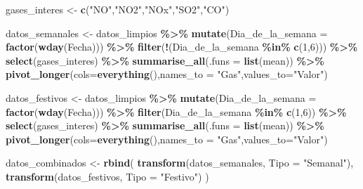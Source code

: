 \documentclass[notspecified,article,submit,moreauthors,pdftex]{Definitions/mdpi}
\newenvironment{Shaded}{\begin{snugshade}}{\end{snugshade}}
\newcommand{\AttributeTok}[1]{\textcolor[rgb]{0.13,0.29,0.53}{#1}}
\newcommand{\DecValTok}[1]{\textcolor[rgb]{0.00,0.00,0.81}{#1}}
\newcommand{\FunctionTok}[1]{\textcolor[rgb]{0.13,0.29,0.53}{\textbf{#1}}}
\newcommand{\NormalTok}[1]{#1}
\newcommand{\OtherTok}[1]{\textcolor[rgb]{0.56,0.35,0.01}{#1}}
\newcommand{\SpecialCharTok}[1]{\textcolor[rgb]{0.81,0.36,0.00}{\textbf{#1}}}
\newcommand{\StringTok}[1]{\textcolor[rgb]{0.31,0.60,0.02}{#1}}
\begin{document}
\begin{Shaded}
\begin{Highlighting}[]
\NormalTok{gases\_interes }\OtherTok{\textless{}{-}} \FunctionTok{c}\NormalTok{(}\StringTok{"NO"}\NormalTok{,}\StringTok{"NO2"}\NormalTok{,}\StringTok{"NOx"}\NormalTok{,}\StringTok{"SO2"}\NormalTok{,}\StringTok{"CO"}\NormalTok{)}

\NormalTok{datos\_semanales }\OtherTok{\textless{}{-}}\NormalTok{ datos\_limpios }\SpecialCharTok{\%\textgreater{}\%}
  \FunctionTok{mutate}\NormalTok{(}\AttributeTok{Dia\_de\_la\_semana =} \FunctionTok{factor}\NormalTok{(}\FunctionTok{wday}\NormalTok{(Fecha))) }\SpecialCharTok{\%\textgreater{}\%}
  \FunctionTok{filter}\NormalTok{(}\SpecialCharTok{!}\NormalTok{(Dia\_de\_la\_semana }\SpecialCharTok{\%in\%} \FunctionTok{c}\NormalTok{(}\DecValTok{1}\NormalTok{,}\DecValTok{6}\NormalTok{))) }\SpecialCharTok{\%\textgreater{}\%}
  \FunctionTok{select}\NormalTok{(gases\_interes) }\SpecialCharTok{\%\textgreater{}\%}
  \FunctionTok{summarise\_all}\NormalTok{(}\AttributeTok{.funs =} \FunctionTok{list}\NormalTok{(mean)) }\SpecialCharTok{\%\textgreater{}\%}
  \FunctionTok{pivot\_longer}\NormalTok{(}\AttributeTok{cols=}\FunctionTok{everything}\NormalTok{(),}\AttributeTok{names\_to =} \StringTok{"Gas"}\NormalTok{,}\AttributeTok{values\_to=}\StringTok{"Valor"}\NormalTok{)}

\NormalTok{datos\_festivos }\OtherTok{\textless{}{-}}\NormalTok{ datos\_limpios }\SpecialCharTok{\%\textgreater{}\%}
  \FunctionTok{mutate}\NormalTok{(}\AttributeTok{Dia\_de\_la\_semana =} \FunctionTok{factor}\NormalTok{(}\FunctionTok{wday}\NormalTok{(Fecha))) }\SpecialCharTok{\%\textgreater{}\%}
  \FunctionTok{filter}\NormalTok{(Dia\_de\_la\_semana }\SpecialCharTok{\%in\%} \FunctionTok{c}\NormalTok{(}\DecValTok{1}\NormalTok{,}\DecValTok{6}\NormalTok{)) }\SpecialCharTok{\%\textgreater{}\%}
  \FunctionTok{select}\NormalTok{(gases\_interes) }\SpecialCharTok{\%\textgreater{}\%}
  \FunctionTok{summarise\_all}\NormalTok{(}\AttributeTok{.funs =} \FunctionTok{list}\NormalTok{(mean)) }\SpecialCharTok{\%\textgreater{}\%}
  \FunctionTok{pivot\_longer}\NormalTok{(}\AttributeTok{cols=}\FunctionTok{everything}\NormalTok{(),}\AttributeTok{names\_to =} \StringTok{"Gas"}\NormalTok{,}\AttributeTok{values\_to=}\StringTok{"Valor"}\NormalTok{)}

\NormalTok{datos\_combinados }\OtherTok{\textless{}{-}} \FunctionTok{rbind}\NormalTok{(}
  \FunctionTok{transform}\NormalTok{(datos\_semanales, }\AttributeTok{Tipo =} \StringTok{"Semanal"}\NormalTok{),}
  \FunctionTok{transform}\NormalTok{(datos\_festivos, }\AttributeTok{Tipo =} \StringTok{"Festivo"}\NormalTok{)}
\NormalTok{)}


\end{Highlighting}
\end{Shaded}
\end{document}
